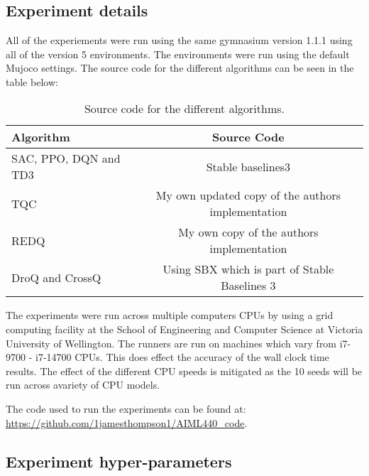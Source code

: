 \chapter{}\label{C:appendixA}

\section{Experiment details}

All of the experiements were run using the same gymnasium version 1.1.1 using all of the version 5 environments. The environments were run using the default Mujoco settings. The source code for the different algorithms can be seen in the table below:

\begin{table}[H]
\centering
\caption{Source code for the different algorithms.}
\label{tab:sourcecode}
\begin{tabular}{l|c}
\toprule
\textbf{Algorithm}                & \textbf{Source Code}             \\
\midrule\midrule
SAC, PPO, DQN and TD3 & Stable baselines3 \cite{stable-baselines3} \\

TQC & My own updated copy of the authors implementation \cite{thompson1jamesthompson1Tqc_pytorch2025} \cite{SamsungLabsTqc_pytorchImplementation} \\
REDQ & My own copy of the authors implementation \cite{thompson1jamesthompson1REDQ2025} \cite{watchernyuWatchernyuREDQ2025} \\
DroQ and CrossQ & Using SBX which is part of Stable Baselines 3 \cite{stable-baselines3} \\

\bottomrule
\end{tabular}
\end{table}

The experiments were run across multiple computers CPUs by using a grid computing facility at the School of Engineering and Computer Science at Victoria University of Wellington. The runners are run on machines which vary from i7-9700 - i7-14700 CPUs. This does effect the accuracy of the wall clock time results. The effect of the different CPU speeds is mitigated as the 10 seeds will be run across avariety of CPU models.

The code used to run the experiments can be found at: \url{https://github.com/1jamesthompson1/AIML440_code}.

\section{Experiment hyper-parameters}

